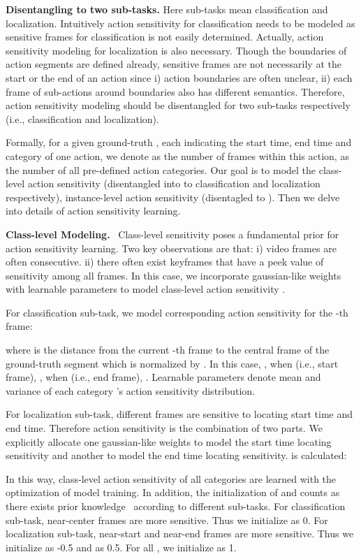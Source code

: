 \documentclass[10pt,twocolumn,letterpaper]{article}
\begin{document}
\textbf{Disentangling to two sub-tasks.} Here sub-tasks mean classification and localization. Intuitively action sensitivity for classification needs to be modeled as sensitive frames for classification is not easily determined. Actually, action sensitivity modeling for localization is also necessary. Though the boundaries of action segments are defined already, sensitive frames are not necessarily at the start or the end of an action since i) action boundaries are often unclear, ii) each frame of sub-actions around boundaries also has different semantics. Therefore, action sensitivity modeling should be disentangled for two sub-tasks respectively (i.e., classification and localization). 

\par Formally, for a given ground-truth , each indicating the start time, end time and category of one action, we denote  as the number of frames within this action,  as the number of all pre-defined action categories. Our goal is to model the class-level action sensitivity  (disentangled into  to classification and localization respectively), instance-level action sensitivity  (disentagled to ).  Then we delve into details of action sensitivity learning.

\textbf{Class-level Modeling.}  
  \ Class-level sensitivity poses a fundamental prior for action sensitivity learning. 
  Two key observations are that: i) video frames are often consecutive. ii) there often exist keyframes that have a peek value of sensitivity among all frames. 
  In this case, we incorporate gaussian-like weights with learnable parameters  to model class-level action sensitivity .
\par For classification sub-task, we model corresponding action sensitivity   for the -th frame:

where  is the distance from the current -th frame to the central frame of the ground-truth segment which is normalized by . In this case, , when  (i.e., start frame), , when  (i.e., end frame), .
Learnable parameters  denote mean and variance of each category 's action sensitivity distribution.
\par For localization sub-task, different frames are sensitive to locating start time and end time. Therefore action sensitivity  is the combination of two parts.
We explicitly allocate one gaussian-like weights  to model the start time locating sensitivity and another  to model the end time locating sensitivity.  is calculated: 

\par In this way, class-level action sensitivity  of all categories are learned with the optimization of model training.
In addition, the initialization of  and  counts as there exists prior knowledge~\cite{zhang2022actionformer,tian2019fcos} according to different sub-tasks. For classification sub-task, near-center frames are more sensitive. Thus we initialize  as 0. For localization sub-task, near-start and near-end frames are more sensitive. Thus we initialize  as -0.5 and  as 0.5.
For all , we initialize as 1.
\end{document}
